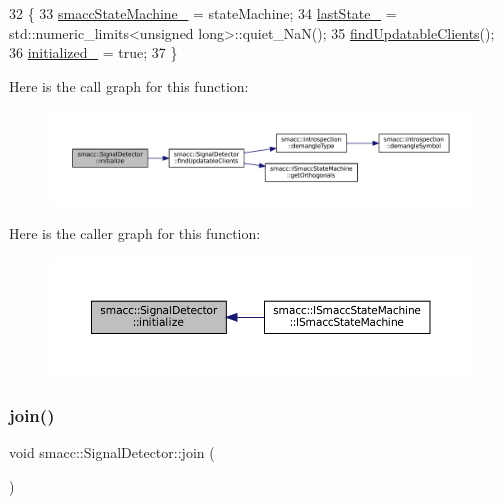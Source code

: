 \begin{DoxyCode}
32     \{
33         \hyperlink{classsmacc_1_1SignalDetector_a46025de6ac7b5980e22144f9703236a4}{smaccStateMachine\_} = stateMachine;
34         \hyperlink{classsmacc_1_1SignalDetector_a72293ed0e98f4200fbe75b53f1e41eab}{lastState\_} = std::numeric\_limits<unsigned long>::quiet\_NaN();
35         \hyperlink{classsmacc_1_1SignalDetector_a47ec2df560e2e33758ce3975bece9385}{findUpdatableClients}();
36         \hyperlink{classsmacc_1_1SignalDetector_a1b3c54963799b538078619906edd5302}{initialized\_} = \textcolor{keyword}{true};
37     \}
\end{DoxyCode}
Here is the call graph for this function\+:
\nopagebreak
\begin{figure}[H]
\begin{center}
\leavevmode
\includegraphics[width=350pt]{classsmacc_1_1SignalDetector_a91ab3cd92d8095cdaf8610b50731f04b_cgraph}
\end{center}
\end{figure}
Here is the caller graph for this function\+:
\nopagebreak
\begin{figure}[H]
\begin{center}
\leavevmode
\includegraphics[width=350pt]{classsmacc_1_1SignalDetector_a91ab3cd92d8095cdaf8610b50731f04b_icgraph}
\end{center}
\end{figure}
\mbox{\label{classsmacc_1_1SignalDetector_a636f704e469bf74b4a9fdb15bd63d5be}} 
\subsubsection{\texorpdfstring{join()}{join()}}
{\footnotesize\ttfamily void smacc\+::\+Signal\+Detector\+::join (\begin{DoxyParamCaption}{ }\end{DoxyParamCaption})}

